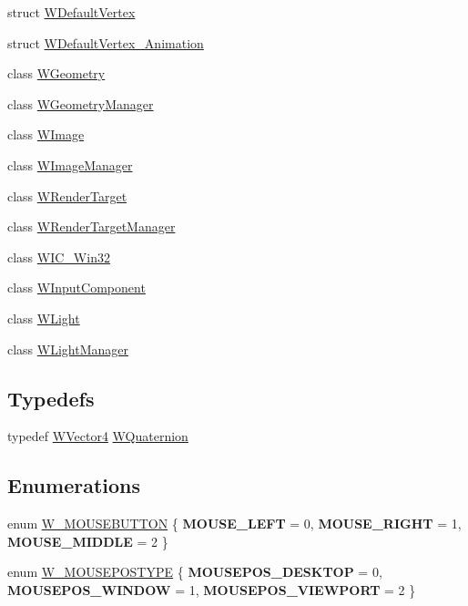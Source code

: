 \begin{DoxyCompactItemize}
struct \hyperlink{struct_w_default_vertex}{W\+Default\+Vertex}
\item 
struct \hyperlink{struct_w_default_vertex___animation}{W\+Default\+Vertex\+\_\+\+Animation}
\item 
class \hyperlink{class_w_geometry}{W\+Geometry}
\item 
class \hyperlink{class_w_geometry_manager}{W\+Geometry\+Manager}
\item 
class \hyperlink{class_w_image}{W\+Image}
\item 
class \hyperlink{class_w_image_manager}{W\+Image\+Manager}
\item 
class \hyperlink{class_w_render_target}{W\+Render\+Target}
\item 
class \hyperlink{class_w_render_target_manager}{W\+Render\+Target\+Manager}
\item 
class \hyperlink{class_w_i_c___win32}{W\+I\+C\+\_\+\+Win32}
\item 
class \hyperlink{class_w_input_component}{W\+Input\+Component}
\item 
class \hyperlink{class_w_light}{W\+Light}
\item 
class \hyperlink{class_w_light_manager}{W\+Light\+Manager}
\end{DoxyCompactItemize}
\subsection*{Typedefs}
\begin{DoxyCompactItemize}
\item 
typedef \hyperlink{class_w_vector4}{W\+Vector4} \hyperlink{group__engineclass_ga717cc687f6844e7a4a2de4948b96c6ef}{W\+Quaternion}
\end{DoxyCompactItemize}
\subsection*{Enumerations}
\begin{DoxyCompactItemize}
\item 
enum \hyperlink{group__engineclass_ga9e78ddd4770694b21c0d4b852e9c800e}{W\+\_\+\+M\+O\+U\+S\+E\+B\+U\+T\+T\+ON} \{ {\bfseries M\+O\+U\+S\+E\+\_\+\+L\+E\+FT} = 0, 
{\bfseries M\+O\+U\+S\+E\+\_\+\+R\+I\+G\+HT} = 1, 
{\bfseries M\+O\+U\+S\+E\+\_\+\+M\+I\+D\+D\+LE} = 2
 \}
\item 
enum \hyperlink{group__engineclass_ga6b8628ac07d789a9caf635eb23728d04}{W\+\_\+\+M\+O\+U\+S\+E\+P\+O\+S\+T\+Y\+PE} \{ {\bfseries M\+O\+U\+S\+E\+P\+O\+S\+\_\+\+D\+E\+S\+K\+T\+OP} = 0, 
{\bfseries M\+O\+U\+S\+E\+P\+O\+S\+\_\+\+W\+I\+N\+D\+OW} = 1, 
{\bfseries M\+O\+U\+S\+E\+P\+O\+S\+\_\+\+V\+I\+E\+W\+P\+O\+RT} = 2
 \}
\end{DoxyCompactItemize}


